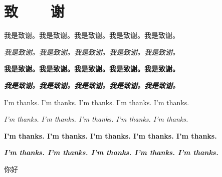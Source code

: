 \chapter{致~~~~谢}

我是致谢。我是致谢。我是致谢。我是致谢。我是致谢。

\textit{我是致谢。我是致谢。我是致谢。我是致谢。我是致谢。}

\textbf{我是致谢。我是致谢。我是致谢。我是致谢。我是致谢。}

\textbf{\textit{我是致谢。我是致谢。我是致谢。我是致谢。我是致谢。}}

I'm thanks. I'm thanks. I'm thanks. I'm thanks. I'm thanks.

\textit{I'm thanks. I'm thanks. I'm thanks. I'm thanks. I'm thanks.}

\textbf{I'm thanks. I'm thanks. I'm thanks. I'm thanks. I'm thanks.}

\textbf{\textit{I'm thanks. I'm thanks. I'm thanks. I'm thanks. I'm thanks.}}

{\heiti 你好} {}
\clearpage